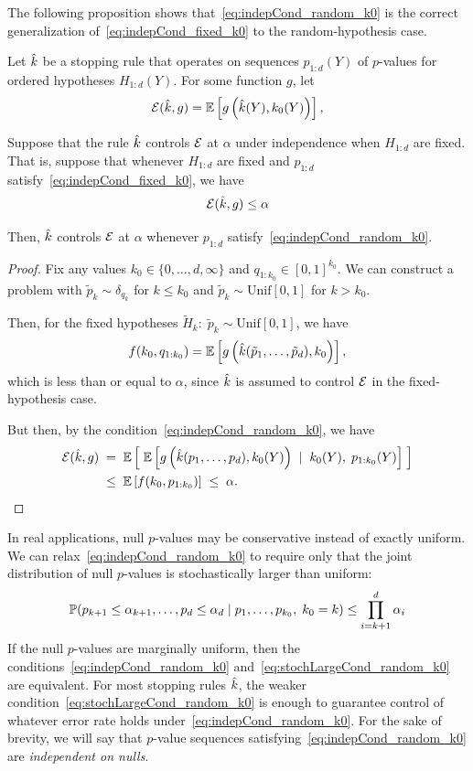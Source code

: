 \documentclass{article}
\begin{document}
The following proposition shows that~\eqref{eq:indepCond_random_k0} is the correct generalization of~\eqref{eq:indepCond_fixed_k0} to the random-hypothesis case.
\begin{proposition}
  Let $\hk$ be a stopping rule that operates on sequences
  $p_{1:d}(Y)$ of $p$-values for ordered hypotheses $H_{1:d}(Y)$. 
  For some function $g$, let 
  \[
  \Err(\hk,g) = \E\left[ g\left(\hk(Y), k_0(Y)\right)\right],
  \]
  
  Suppose that the rule $\hk$ controls $\Err$ at $\alpha$ under
  independence when $H_{1:d}$ are fixed. That is, suppose that
  whenever $H_{1:d}$ are fixed and $p_{1:d}$
  satisfy~\eqref{eq:indepCond_fixed_k0}, we have
  \[
  \Err(\hk, g) \leq \alpha
  \]

  Then, $\hk$ controls $\Err$ at $\alpha$
  whenever $p_{1:d}$ satisfy~\eqref{eq:indepCond_random_k0}.
\end{proposition}
\begin{proof}
  Fix any values $k_0\in \{0,\ldots,d, \infty\}$ and $q_{1:k_0} \in [0,1]^{k_0}$. We can construct a problem with $\tilde p_k \sim \delta_{q_k}$ for $k\leq k_0$ and  $\tilde p_k \sim \text{Unif}[0,1]$ for $k > k_0$. 
   

  Then, for the fixed hypotheses 
  $\widetilde H_k:\; \tilde p_k \sim \text{Unif}[0,1]$, we have
  \[
  f(k_0, q_{1:k_0}) 
  = \E\left[ g\left(\hk(\tilde p_1, \ldots, \tilde p_d),
      k_0\right) \right],
  \]
  which is less than or equal to $\alpha$, since $\hk$ is assumed to control $\Err$ in the fixed-hypothesis case.

  But then, by the condition~\eqref{eq:indepCond_random_k0}, we have
  \begin{align}
    \Err(\hk,g) &\;=\; \E\left[ \;\E\left[ g\left(\hk(p_1,\ldots, p_d), k_0(Y)\right) \; \mid \; k_0(Y), \; p_{1:k_0}(Y)\right] \; \right]\\
    &\;\leq\; \E\left[f(k_0, p_{1:k_0})\right] \;\leq\; \alpha.
  \end{align}
\end{proof}

In real applications, null $p$-values may be conservative instead of exactly uniform. We can relax~\eqref{eq:indepCond_random_k0} to require only that the joint distribution of null $p$-values is stochastically larger than uniform:
\begin{equation}\label{eq:stochLargeCond_random_k0}
  \P(p_{k+1} \leq \alpha_{k+1}, \ldots, p_d \leq \alpha_d
  \mid p_1, \ldots, p_{k_0}, \; k_0 = k) \leq \prod_{i=k+1}^d \alpha_i
\end{equation}
If the null $p$-values are marginally uniform, then the conditions~\eqref{eq:indepCond_random_k0} and~\eqref{eq:stochLargeCond_random_k0} are equivalent. For most stopping rules $\hk$, the weaker condition~\eqref{eq:stochLargeCond_random_k0} is enough to guarantee control of whatever error rate holds under~\eqref{eq:indepCond_random_k0}. For the sake of brevity, we will say that $p$-value sequences satisfying~\eqref{eq:indepCond_random_k0} are {\em independent on nulls}.
\end{document}
